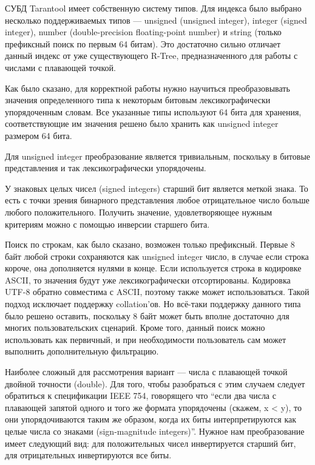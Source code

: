 СУБД Tarantool имеет собственную систему типов. Для индекса было выбрано несколько поддерживаемых типов --- unsigned (unsigned integer), integer (signed integer), number (double-precision floating-point number) и string (только префиксный поиск по первым 64 битам). Это достаточно сильно отличает данный индекс от уже существующего R-Tree, предназначенного для работы с числами с плавающей точкой.

Как было сказано, для корректной работы нужно научиться преобразовывать значения определенного типа к некоторым битовым лексикографически упорядоченным словам. Все указанные типы используют 64 бита для хранения, соответствующие им значения решено было хранить как unsigned integer размером 64 бита. 

Для unsigned integer преобразование является тривиальным, поскольку в битовые представления и так лексикографически упорядочены. 

У знаковых целых чисел (signed integers) старший бит является меткой знака. То есть с точки зрения бинарного представления любое отрицательное число больше любого положительного. Получить значение, удовлетворяющее нужным критериям можно с помощью инверсии старшего бита.

Поиск по строкам, как было сказано, возможен только префиксный. Первые 8 байт любой строки сохраняются как unsigned integer число, в случае если строка короче, она дополняется нулями в конце. Если используется строка в кодировке ASCII, то значения будут уже лексикографически отсортированы. Кодировка UTF-8 обратно совместима с ASCII, поэтому также может использоваться. Такой подход исключает поддержку collation’ов. Но всё-таки поддержку данного типа было решено оставить, поскольку 8 байт может быть вполне достаточно для многих пользовательских сценарий. Кроме того, данный поиск можно использовать как первичный, и при необходимости пользователь сам может выполнить дополнительную фильтрацию.

Наиболее сложный для рассмотрения вариант --- числа с плавающей точкой двойной точности (double).
Для того, чтобы разобраться с этим случаем следует обратиться к спецификации IEEE 754,
говорящего что “если два числа с плавающей запятой одного и того же формата упорядочены (скажем, x < y),
то они упорядочиваются таким же образом, когда их биты интерпретируются как целые числа со знаками (sign-magnitude integers)”.
Нужное нам преобразование имеет следующий вид: для положительных чисел инвертируется старший бит, для отрицательных инвертируются все биты.

